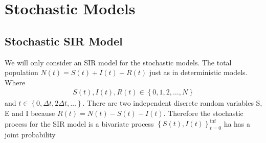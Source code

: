 %
%
%
%
%
%
%
\section{Stochastic Models}
\subsection{ Stochastic SIR Model}
We will only consider an SIR model for the stochastic models. The total population $N(t) = S(t)  + I(t) + R(t)$ just as in deterministic models. Where 
\begin{align}
S(t), I(t), R(t) \in \left\lbrace 0,1,2,\dots , N \right\rbrace 
\end{align}
and $t \in \left\lbrace 0,\Delta t ,2 \Delta t, \dots \right\rbrace$. There are two independent discrete random variables  S, E and I because $R(t) = N(t) -S(t) -I(t)$. Therefore the stochastic process for the SIR model is a bivariate process $\left\lbrace S(t), I(t) \right \rbrace^{\inf}_{t =0}$ ha has a joint probability 

